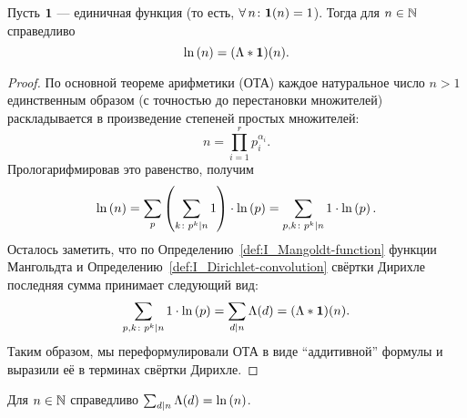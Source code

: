 \begin{ntheorem}
\label{thm:I-2}
	Пусть $\textbf{1}$ --- единичная функция (то есть, $\forall n\colon \1(n) = 1$). Тогда для $n \in \mathbb{N}$ справедливо
	\[
		\operatorname{ln}\left( n \right) = (\Lambda \ast \textbf{1})(n).
	\]
\end{ntheorem}
\begin{proof}
	По основной теореме арифметики (ОТА) каждое натуральное число $n > 1$ единственным образом (с точностью до перестановки множителей) раскладывается в произведение степеней простых множителей:
	\[
	    n = \prod_{i=1}^{r} p_i^{\alpha_i}.
	\]
	Прологарифмировав это равенство, получим
	\[
		\operatorname{ln}\left( n \right) 
		= \sum_{p}\left( \sum_{k\colon p^k \mid n} 1 \right) \cdot \operatorname{ln}\left( p \right) 
		= \sum_{p,k\colon p^k \mid n} 1 \cdot \operatorname{ln}\left( p \right).
	\]
	Осталось заметить, что по Определению~\ref{def:I_Mangoldt-function} функции Мангольдта и Определению~\ref{def:I_Dirichlet-convolution} свёртки Дирихле последняя сумма принимает следующий вид:
	\[
		\sum_{p,k\colon p^k \mid n} 1 \cdot \operatorname{ln}\left( p \right) 
		= \sum_{d \mid n} \Lambda(d) = (\Lambda \ast \textbf{1})(n).
	\]
	Таким образом, мы переформулировали ОТА в виде ``аддитивной'' формулы и выразили её в терминах свёртки Дирихле.
\end{proof}

\begin{ncorollary}
\label{crl:I-5}
	Для $n \in \mathbb{N}$ справедливо $\sum_{d \mid n} \Lambda(d) = \operatorname{ln}\left( n \right)$.
\end{ncorollary}

